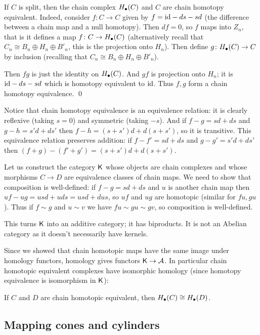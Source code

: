 \eproof

\bexam

    If $C$ is split, then the chain complex $H_\bullet(C)$ and $C$ are chain homotopy equivalent.
    Indeed, consider $f\colon C\to C$ given by $f={\rm id}-ds-sd$ (the difference between a chain map and a null homotopy).
    Then $df=0$, so $f$ maps into $Z_n$, that is it defines a map $f\colon C\to H_\bullet(C)$ (alternatively recall that $C_n\cong B_n\oplus H_n\oplus B'_n$, this is the projection onto $H_n$).
    Then define $g\colon H_\bullet(C)\to C$ by inclusion (recalling that $C_n\cong B_n\oplus H_n\oplus B'_n$).

    Then $fg$ is just the identity on $H_\bullet(C)$.
    And $gf$ is projection onto $H_n$; it is ${\rm id}-ds-sd$ which is homotopy equivalent to ${\rm id}$.
    Thus $f,g$ form a chain homotopy equivalence.
    \qed

\eexam

Notice that chain homotopy equivalence is an equivalence relation: it is clearly reflexive (taking $s=0$) and symmetric (taking $-s$).
And if $f-g=sd+ds$ and $g-h=s'd+ds'$ then $f-h=(s+s')d+d(s+s')$, so it is transitive.
This equivalence relation preserves addition: if $f-f'=sd+ds$ and $g-g'=s'd+ds'$ then $(f+g)-(f'+g')=(s+s')d+d(s+s')$.

Let us construct the category ${\sf K}$ whose objects are chain complexes and whose morphisms $C\to D$ are equivalence classes of chain maps.
We need to show that composition is well-defined: if $f-g=sd+ds$ and $u$ is another chain map then $uf-ug=usd+uds=usd+dus$, so $uf$ and $ug$ are homotopic (similar for $fu,gu$).
Thus if $f\sim g$ and $u\sim v$ we have $fu\sim gu\sim gv$, so composition is well-defined.

This turns ${\sf K}$ into an additive category; it has biproducts.
It is not an Abelian category as it doesn't necessarily have kernels.

Since we showed that chain homotopic maps have the same image under homology functors, homology gives functors ${\sf K}\to{{\cal A}}$.
In particular chain homotopic equivalent complexes have isomorphic homology (since homotopy equivalence is isomorphism in ${\sf K}$):

\bthrm

    If $C$ and $D$ are chain homotopic equivalent, then $H_\bullet(C)\cong H_\bullet(D)$.

\ethrm

\subsection{Mapping cones and cylinders}

